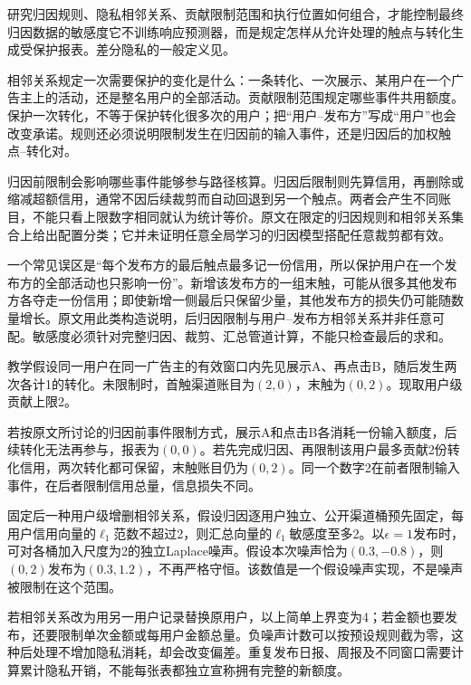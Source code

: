 研究归因规则、隐私相邻关系、贡献限制范围和执行位置如何组合，才能控制最终归因数据的敏感度它不训练响应预测器，而是规定怎样从允许处理的触点与转化生成受保护报表。差分隐私的一般定义见。

相邻关系规定一次需要保护的变化是什么：一条转化、一次展示、某用户在一个广告主上的活动，还是整名用户的全部活动。贡献限制范围规定哪些事件共用额度。保护一次转化，不等于保护转化很多次的用户；把“用户--发布方”写成“用户”也会改变承诺。规则还必须说明限制发生在归因前的输入事件，还是归因后的加权触点--转化对。

归因前限制会影响哪些事件能够参与路径核算。归因后限制则先算信用，再删除或缩减超额信用，通常不因后续裁剪而自动回退到另一个触点。两者会产生不同账目，不能只看上限数字相同就认为统计等价。原文在限定的归因规则和相邻关系集合上给出配置分类；它并未证明任意全局学习的归因模型搭配任意裁剪都有效。

一个常见误区是“每个发布方的最后触点最多记一份信用，所以保护用户在一个发布方的全部活动也只影响一份”。新增该发布方的一组末触，可能从很多其他发布方各夺走一份信用；即使新增一侧最后只保留少量，其他发布方的损失仍可能随数量增长。原文用此类构造说明，后归因限制与用户--发布方相邻关系并非任意可配。敏感度必须针对完整归因、裁剪、汇总管道计算，不能只检查最后的求和。

\begin{example}[归因前后裁剪的区别]
教学假设同一用户在同一广告主的有效窗口内先见展示A、再点击B，随后发生两次各计1的转化。未限制时，首触渠道账目为$(2,0)$，末触为$(0,2)$。现取用户级贡献上限2。

若按原文所讨论的归因前事件限制方式，展示A和点击B各消耗一份输入额度，后续转化无法再参与，报表为$(0,0)$。若先完成归因、再限制该用户最多贡献2份转化信用，两次转化都可保留，末触账目仍为$(0,2)$。同一个数字2在前者限制输入事件，在后者限制信用总量，信息损失不同。

固定后一种用户级增删相邻关系，假设归因逐用户独立、公开渠道桶预先固定，每用户信用向量的$\ell_1$范数不超过2，则汇总向量的$\ell_1$敏感度至多2。以$\epsilon=1$发布时，可对各桶加入尺度为2的独立Laplace噪声。假设本次噪声恰为$(0.3,-0.8)$，则$(0,2)$发布为$(0.3,1.2)$，不再严格守恒。该数值是一个假设噪声实现，不是噪声被限制在这个范围。
\end{example}

若相邻关系改为用另一用户记录替换原用户，以上简单上界变为4；若金额也要发布，还要限制单次金额或每用户金额总量。负噪声计数可以按预设规则截为零，这种后处理不增加隐私消耗，却会改变偏差。重复发布日报、周报及不同窗口需要计算累计隐私开销，不能每张表都独立宣称拥有完整的新额度。

